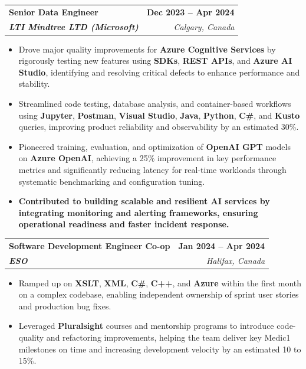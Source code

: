 \documentclass[letterpaper,11pt]{article}
\makeatletter
\newcommand{\resumeItem}[1]{
  \item\small{
    {#1 \vspace{-2pt}}
  }
}
\newcommand{\resumeSubheading}[4]{
  \vspace{-2pt}\item
    \begin{tabular*}{1.0\textwidth}[t]{l@{\extracolsep{\fill}}r}
      \textbf{#1} & \textbf{\small #2} \\
      \textit{\small#3} & \textit{\small #4} \\
    \end{tabular*}\vspace{-7pt}
}
\newcommand{\resumeItemListStart}{\begin{itemize}}
\newcommand{\resumeItemListEnd}{\end{itemize}\vspace{-5pt}}
\makeatother
\begin{document}
    \resumeSubheading
      {\textbf{Senior Data Engineer}}{\textbf{Dec 2023 -- Apr 2024}}
      {\textbf{LTI Mindtree LTD (Microsoft)}}{Calgary, Canada}
      \resumeItemListStart
        \resumeItem{Drove major quality improvements for \textbf{Azure Cognitive Services} by rigorously testing new features using \textbf{SDKs}, \textbf{REST APIs}, and \textbf{Azure AI Studio}, identifying and resolving critical defects to enhance performance and stability.}
        \resumeItem{Streamlined code testing, database analysis, and container-based workflows using \textbf{Jupyter}, \textbf{Postman}, \textbf{Visual Studio}, \textbf{Java}, \textbf{Python}, \textbf{C\#}, and \textbf{Kusto} queries, improving product reliability and observability by an estimated 30\%.}
        \resumeItem{Pioneered training, evaluation, and optimization of \textbf{OpenAI GPT} models on \textbf{Azure OpenAI}, achieving a 25\% improvement in key performance metrics and significantly reducing latency for real-time workloads through systematic benchmarking and configuration tuning.}
        \resumeItem{\textbf{Contributed to building scalable and resilient AI services by integrating monitoring and alerting frameworks, ensuring operational readiness and faster incident response.}}
      \resumeItemListEnd
    
    \resumeSubheading
      {\textbf{Software Development Engineer Co-op}}{\textbf{Jan 2024 -- Apr 2024}}
      {\textbf{ESO}}{Halifax, Canada}
      \resumeItemListStart
        \resumeItem{Ramped up on \textbf{XSLT}, \textbf{XML}, \textbf{C\#}, \textbf{C++}, and \textbf{Azure} within the first month on a complex codebase, enabling independent ownership of sprint user stories and production bug fixes.}
        \resumeItem{Leveraged \textbf{Pluralsight} courses and mentorship programs to introduce code-quality and refactoring improvements, helping the team deliver key Medic1 milestones on time and increasing development velocity by an estimated 10 to 15\%.}
      \resumeItemListEnd
\end{document}
